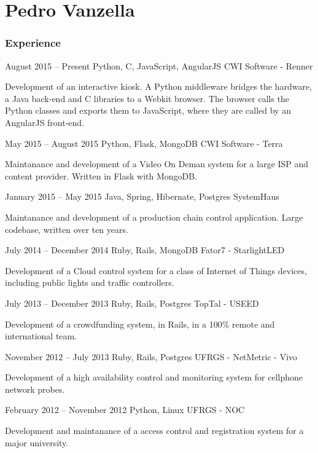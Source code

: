 \documentclass{tccv}
\begin{document}
\part{Pedro Vanzella}

\section{Experience}

\begin{eventlist}

\item{August 2015 -- Present}
     {Python, C, JavaScript, AngularJS}
     {CWI Software - Renner}
     
Development of an interactive kiosk. A Python middleware bridges the hardware, a
Java back-end and C libraries to a Webkit browser. The browser calls the Python
classes and exports them to JavaScript, where they are called by an AngularJS front-end.

\item{May 2015 -- August 2015}
     {Python, Flask, MongoDB}
     {CWI Software - Terra}

Maintanance and development of a Video On Deman system for a large ISP and
content provider. Written in Flask with MongoDB.

\item{January 2015 -- May 2015}
     {Java, Spring, Hibernate, Postgres}
     {SystemHaus}

Maintanance and development of a production chain control application. Large
codebase, written over ten years.

\item{July 2014 -- December 2014}
     {Ruby, Rails, MongoDB}
     {Fator7 - StarlightLED}

Development of a Cloud control system for a class of Internet of Things devices,
including public lights and traffic controllers.

\item{July 2013 -- December 2013}
     {Ruby, Rails, Postgres}
     {TopTal - USEED}

Development of a crowdfunding system, in Rails, in a 100\% remote and
international team.

\item{November 2012 -- July 2013}
     {Ruby, Rails, Postgres}
     {UFRGS - NetMetric - Vivo}
 
Development of a high availability control and monitoring system for cellphone
network probes.

\item{February 2012 -- November 2012}
     {Python, Linux}
     {UFRGS - NOC}

Development and maintanance of a access control and registration system for a
major university.

\end{eventlist}
\end{document}
